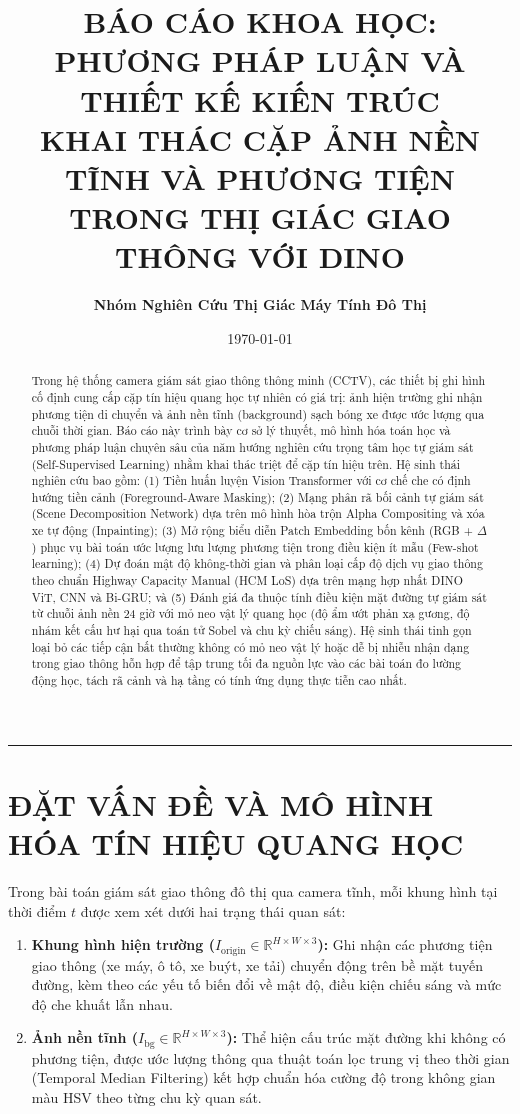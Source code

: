 \documentclass[11pt,a4paper]{article}
\title{\textbf{\Large BÁO CÁO KHOA HỌC: PHƯƠNG PHÁP LUẬN VÀ THIẾT KẾ KIẾN TRÚC\\KHAI THÁC CẶP ẢNH NỀN TĨNH VÀ PHƯƠNG TIỆN TRONG THỊ GIÁC GIAO THÔNG VỚI DINO}}
\author{\textbf{Nhóm Nghiên Cứu Thị Giác Máy Tính Đô Thị}}
\date{\today}
\begin{document}
\maketitle

\begin{abstract}
Trong hệ thống camera giám sát giao thông thông minh (CCTV), các thiết bị ghi hình cố định cung cấp cặp tín hiệu quang học tự nhiên có giá trị: ảnh hiện trường ghi nhận phương tiện di chuyển và ảnh nền tĩnh (background) sạch bóng xe được ước lượng qua chuỗi thời gian. Báo cáo này trình bày cơ sở lý thuyết, mô hình hóa toán học và phương pháp luận chuyên sâu của năm hướng nghiên cứu trọng tâm học tự giám sát (Self-Supervised Learning) nhằm khai thác triệt để cặp tín hiệu trên. Hệ sinh thái nghiên cứu bao gồm: (1) Tiền huấn luyện Vision Transformer với cơ chế che có định hướng tiền cảnh (Foreground-Aware Masking); (2) Mạng phân rã bối cảnh tự giám sát (Scene Decomposition Network) dựa trên mô hình hòa trộn Alpha Compositing và xóa xe tự động (Inpainting); (3) Mở rộng biểu diễn Patch Embedding bốn kênh (RGB + $\Delta$) phục vụ bài toán ước lượng lưu lượng phương tiện trong điều kiện ít mẫu (Few-shot learning); (4) Dự đoán mật độ không-thời gian và phân loại cấp độ dịch vụ giao thông theo chuẩn Highway Capacity Manual (HCM LoS) dựa trên mạng hợp nhất DINO ViT, CNN và Bi-GRU; và (5) Đánh giá đa thuộc tính điều kiện mặt đường tự giám sát từ chuỗi ảnh nền 24 giờ với mỏ neo vật lý quang học (độ ẩm ướt phản xạ gương, độ nhám kết cấu hư hại qua toán tử Sobel và chu kỳ chiếu sáng). Hệ sinh thái tinh gọn loại bỏ các tiếp cận bất thường không có mỏ neo vật lý hoặc dễ bị nhiễu nhận dạng trong giao thông hỗn hợp để tập trung tối đa nguồn lực vào các bài toán đo lường động học, tách rã cảnh và hạ tầng có tính ứng dụng thực tiễn cao nhất.
\end{abstract}

\hrule
\vspace{1em}

\section{ĐẶT VẤN ĐỀ VÀ MÔ HÌNH HÓA TÍN HIỆU QUANG HỌC}

Trong bài toán giám sát giao thông đô thị qua camera tĩnh, mỗi khung hình tại thời điểm $t$ được xem xét dưới hai trạng thái quan sát:
\begin{enumerate}
    \item \textbf{Khung hình hiện trường ($I_{\text{origin}} \in \mathbb{R}^{H \times W \times 3}$):} Ghi nhận các phương tiện giao thông (xe máy, ô tô, xe buýt, xe tải) chuyển động trên bề mặt tuyến đường, kèm theo các yếu tố biến đổi về mật độ, điều kiện chiếu sáng và mức độ che khuất lẫn nhau.
    \item \textbf{Ảnh nền tĩnh ($I_{\text{bg}} \in \mathbb{R}^{H \times W \times 3}$):} Thể hiện cấu trúc mặt đường khi không có phương tiện, được ước lượng thông qua thuật toán lọc trung vị theo thời gian (Temporal Median Filtering) kết hợp chuẩn hóa cường độ trong không gian màu HSV theo từng chu kỳ quan sát.
\end{enumerate}
\end{document}
